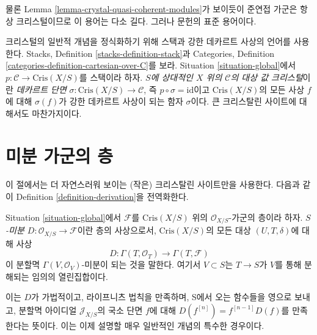 \noindent
물론 Lemma \ref{lemma-crystal-quasi-coherent-modules}가 보이듯이
준연접 가군은 항상 크리스털이므로 이 용어는 다소 길다.
그러나 문헌의 표준 용어이다.

\begin{remark}
\label{remark-crystal}
크리스털의 일반적 개념을 정식화하기 위해 스택과 강한 데카르트
사상의 언어를 사용한다. Stacks, Definition \ref{stacks-definition-stack}과
Categories, Definition \ref{categories-definition-cartesian-over-C}를 보라.
Situation \ref{situation-global}에서
$p : \mathcal{C} \to \text{Cris}(X/S)$를 스택이라 하자.
{\it $S$에 상대적인 $X$ 위의 $\mathcal{C}$의 대상 값 크리스털}이란
{\it 데카르트 단면} $\sigma : \text{Cris}(X/S) \to \mathcal{C}$,
즉 $p \circ \sigma = \text{id}$이고 $\text{Cris}(X/S)$의 모든 사상
$f$에 대해 $\sigma(f)$가 강한 데카르트 사상이 되는 함자 $\sigma$이다.
큰 크리스탈린 사이트에 대해서도 마찬가지이다.
\end{remark}





\section{미분 가군의 층}
\label{section-differentials-sheaf}

\noindent
이 절에서는 더 자연스러워 보이는 (작은) 크리스탈린 사이트만을
사용한다. 다음과 같이 Definition \ref{definition-derivation}을
전역화한다.

\begin{definition}
\label{definition-global-derivation}
Situation \ref{situation-global}에서
$\mathcal{F}$를 $\text{Cris}(X/S)$ 위의
$\mathcal{O}_{X/S}$-가군의 층이라 하자.
{\it $S$-미분 $D : \mathcal{O}_{X/S} \to \mathcal{F}$}이란
층의 사상으로서, $\text{Cris}(X/S)$의 모든 대상
$(U, T, \delta)$에 대해 사상
$$
D : \Gamma(T, \mathcal{O}_T) \longrightarrow \Gamma(T, \mathcal{F})
$$
이 분할멱 $\Gamma(V, \mathcal{O}_V)$-미분이 되는 것을 말한다.
여기서 $V \subset S$는 $T \to S$가 $V$를 통해 분해되는 임의의
열린집합이다.
\end{definition}

\noindent
이는 $D$가 가법적이고, 라이프니츠 법칙을 만족하며, S에서 오는
함수들을 영으로 보내고, 분할멱 아이디얼 $\mathcal{J}_{X/S}$의
국소 단면 $f$에 대해 $D(f^{[n]}) = f^{[n - 1]}D(f)$를 만족한다는
뜻이다. 이는 이제 설명할 매우 일반적인 개념의 특수한 경우이다.

